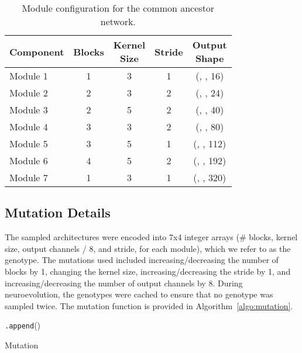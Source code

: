 \documentclass{ieeeaccess}
\begin{document}
\begin{table}[h]
	\footnotesize
	\centering
	\renewcommand\arraystretch{1.3}
	\begin{tabular}{l|c|c|c|c}
		\hline
		Component & \makecell{Blocks\\} & \makecell{Kernel\\Size} & Stride & \makecell{Output\\Shape}\\
		\hline
		Module 1 & 1 & 3 & 1 & (, , 16)\\
		Module 2 & 2 & 3 & 2 & (, , 24)\\
		Module 3 & 2 & 5 & 2 & (, , 40)\\
		Module 4 & 3 & 3 & 2 & (, , 80)\\
		Module 5 & 3 & 5 & 1 & (, , 112)\\
		Module 6 & 4 & 5 & 2 & (, , 192)\\
		Module 7 & 1 & 3 & 1 & (, , 320)\\
		\hline
	\end{tabular}
\caption{Module configuration for the common ancestor network.}
\label{tab:ancestor}
\end{table}

\subsection{Mutation Details}
\label{sec:app_mutation}
The sampled architectures were encoded into 7x4 integer arrays (\# blocks, kernel size, output channels / 8, and stride, for each module), which we refer to as the genotype. The mutations used included increasing/decreasing the number of blocks by 1, changing the kernel size, increasing/decreasing the stride by 1, and increasing/decreasing the number of output channels by 8. During neuroevolution, the genotypes were cached to ensure that no genotype was sampled twice. The mutation function is provided in Algorithm~\ref{algo:mutation}.

\begin{algorithm}
\SetAlgoNoLine
\small
\DontPrintSemicolon
\newcommand\mycommfont[1]{\footnotesize\ttfamily\textcolor{blue}{#1}}

                              
 \;
  \texttt{.append}()

 \caption{Mutation}\label{algo:mutation}
\end{algorithm}
\end{document}
